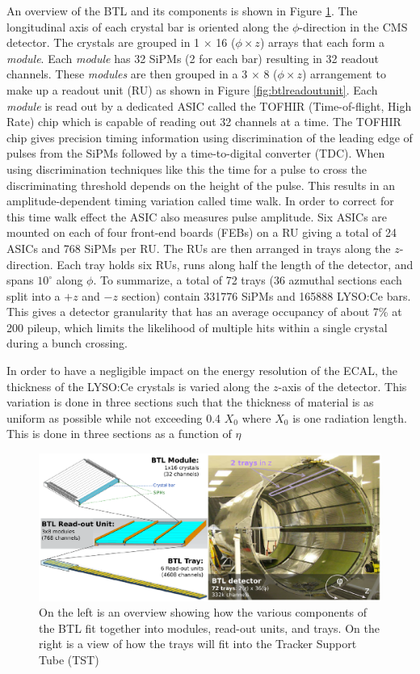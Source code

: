  An overview of the BTL and its components is shown in Figure \ref{fig:btloverview}.  The longitudinal axis of each crystal bar is oriented along the $\phi$-direction in the CMS detector.  The crystals are grouped in 1 $\times$ 16 ($\phi \times z$) arrays that each form a \textit{module}.  Each \textit{module} has 32 SiPMs (2 for each bar) resulting in 32 readout channels.  These \textit{modules} are then grouped in a 3 $\times$ 8 ($\phi \times z$) arrangement to make up a readout unit (RU) as shown in Figure \ref{fig:btlreadoutunit}.  Each \textit{module} is read out by a dedicated ASIC called the TOFHIR (Time-of-flight, High Rate) chip which is capable of reading out 32 channels at a time.  The TOFHIR chip gives precision timing information using discrimination of the leading edge of pulses from the SiPMs followed by a time-to-digital converter (TDC).  When using discrimination techniques like this the time for a pulse to cross the discriminating threshold depends on the height of the pulse.  This results in an amplitude-dependent timing variation called time walk.  In order to correct for this time walk effect the ASIC also measures pulse amplitude. Six ASICs are mounted on each of four front-end boards (FEBs) on a RU giving a total of 24 ASICs and 768 SiPMs per RU.  The RUs are then arranged in trays along the $z$-direction.  Each tray holds six RUs, runs along half the length of the detector, and spans $10^\circ$ along $\phi$.  To summarize, a total of 72 trays (36 azmuthal sections each split into a $+z$ and $-z$ section) contain 331776 SiPMs and 165888 LYSO:Ce bars.  This gives a detector granularity that has an average occupancy of about 7\% at 200 pileup, which limits the likelihood of multiple hits within a single crystal during a bunch crossing.  
 
 In order to have a negligible impact on the energy resolution of the ECAL, the thickness of the LYSO:Ce crystals is varied along the $z$-axis of the detector.  This variation is done in three sections such that the thickness of material is as uniform as possible while not exceeding 0.4 $X_0$ where $X_0$ is one radiation length.  This is done in three sections as a function of $\eta$
 
 
 \begin{figure}[h]
 	\centering
 	\includegraphics[width=1.0\linewidth]{Figures/BTL_overview}
 	\caption[Overview of the BTL]{On the left is an overview showing how the various components of the BTL fit together into modules, read-out units, and trays.  On the right is a view of how the trays will fit into the Tracker Support Tube (TST)}
 	\label{fig:btloverview}
 \end{figure}
 

